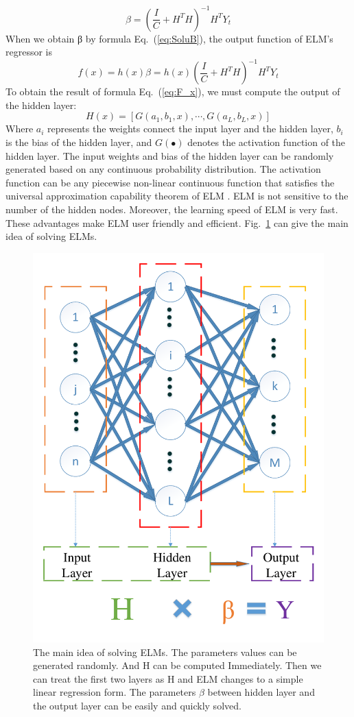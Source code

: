 \documentclass[review,numbers,sort&compress]{elsarticle}  %
\begin{document}
\begin{equation}\label{eq:SoluB}
  \beta = (\frac{I}{C} +H^T H)^{-1} H^T Y_t
\end{equation}
When we obtain β by formula Eq.~(\ref{eq:SoluB}), the output function of ELM’s regressor is
\begin{equation}\label{eq:F_x}
  f(x)= h(x)\beta=h(x) (\frac{I}{C}+H^T H)^{-1} H^T Y_t
\end{equation}
To obtain the result of formula Eq.~(\ref{eq:F_x}), we must compute the output of the hidden layer:
\begin{equation}\label{eq:outHiddenLayer}
  H(x)=[G(a_1,b_1,x),\cdots,G(a_L,b_L,x)]
\end{equation}
Where $a_i$ represents the weights connect the input layer and the hidden layer, $b_i$ is the bias of the hidden layer, and $G(∙)$ denotes the activation function of the hidden layer. The input weights and bias of the hidden layer can be randomly generated based on any continuous probability distribution. The activation function can be any piecewise non-linear continuous function that satisfies the universal approximation capability theorem of ELM \cite{huang2006universal}. ELM is not sensitive to the number of the hidden nodes. Moreover, the learning speed of ELM is very fast. These advantages make ELM user friendly and efficient. Fig.~\ref{fig:elms} can give the main idea of solving ELMs.
\begin{figure}[htbp]
  \centering
  \includegraphics[width=0.6\linewidth]{graphs/ELMs.pdf}
  \caption{The main idea of solving ELMs. The parameters values can be generated randomly. And H can be computed Immediately. Then we can treat the first two layers as H and ELM changes to a simple linear regression form. The parameters $\beta$ between hidden layer and the output layer can be easily and quickly solved.}\label{fig:elms}
\end{figure}
\end{document}
